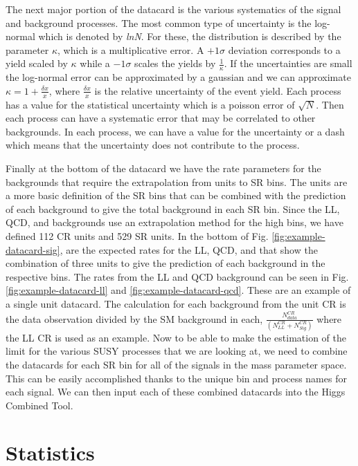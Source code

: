 The next major portion of the datacard is the various systematics of the signal and background processes. The most common type of uncertainty is the log-normal which is denoted by \textit{lnN}. For these, the distribution is described by the parameter $\kappa$, which is a multiplicative error. A $+1\sigma$ deviation corresponds to a yield scaled by $\kappa$ while a $-1\sigma$ scales the yields by $\frac{1}{\kappa}$. If the uncertainties are small the log-normal error can be approximated by a gaussian and we can approximate $\kappa=1+\frac{\delta x}{x}$, where $\frac{\delta x}{x}$ is the relative uncertainty of the event yield. Each process has a value for the statistical uncertainty which is a poisson error of $\sqrt{N}$. Then each process can have a systematic error that may be correlated to other backgrounds. In each process, we can have a value for the uncertainty or a dash which means that the uncertainty does not contribute to the process. 

Finally at the bottom of the datacard we have the rate parameters for the backgrounds that require the extrapolation from units to SR bins. The units are a more basic definition of the SR bins that can be combined with the prediction of each background to give the total background in each SR bin. Since the LL, QCD, and \Znunu{} backgrounds use an extrapolation method for the high \dm{} bins, we have defined 112 CR units and 529 SR units. In the bottom of Fig. \ref{fig:example-datacard-sig}, are the expected rates for the LL, QCD, and \Znunu{} that show the combination of three units to give the prediction of each background in the respective bins. The rates from the LL and QCD background can be seen in Fig. \ref{fig:example-datacard-ll} and \ref{fig:example-datacard-qcd}. These are an example of a single unit datacard. The calculation for each background from the unit CR is the data observation divided by the SM background in each, $\frac{N_{data}^{CR}}{(N_{LL}^{CR} + N_{Sig}^{CR})}$ where the LL CR is used as an example. Now to be able to make the estimation of the limit for the various SUSY processes that we are looking at, we need to combine the datacards for each SR bin for all of the signals in the mass parameter space. This can be easily accomplished thanks to the unique bin and process names for each signal. We can then input each of these combined datacards into the Higgs Combined Tool.

\section{Statistics}\label{sec:Statistics}

